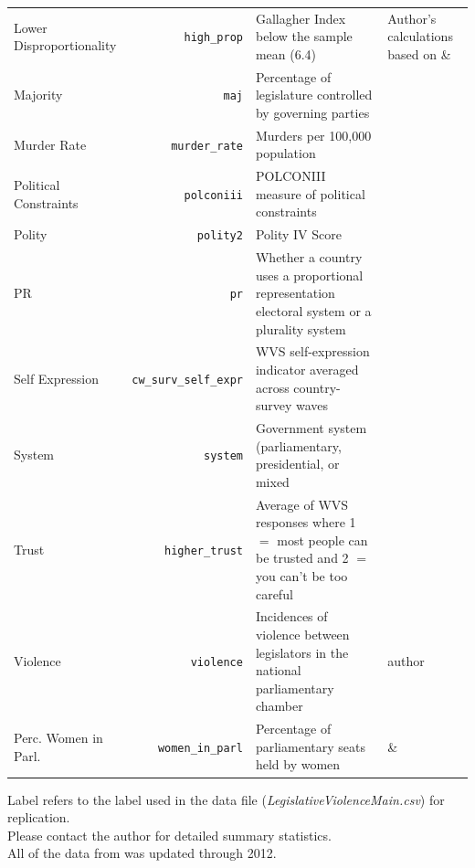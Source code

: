 \documentclass[a4paper]{article}\usepackage[]{graphicx}\usepackage[]{color}
\begin{document}
\begin{table}[!h]
\begin{center}
\begin{tabular}{m{2cm} r m{7cm} m{3.5cm}}
            Lower Disproportionality & \verb|high_prop| & Gallagher Index below the sample mean (6.4) & Author's calculations based on \cite{Gallagher2012} \& \cite{Carey2011}\\
            Majority & \texttt{maj} & Percentage of legislature controlled by governing parties & \cite{DPI2001} \\
            Murder Rate & \verb|murder_rate| & Murders per 100,000 population & \cite{UNMurder2013} \\
            Political Constraints & \texttt{polconiii} & POLCONIII measure of political constraints & \cite[][updated through 2011]{Henisz2004} \\
            Polity & \texttt{polity2} & Polity IV Score & \cite{Marshall2009} \\
            PR & \texttt{pr} & Whether a country uses a proportional representation electoral system or a plurality system & \cite{DPI2001} \\
            Self Expression & \verb|cw_surv_self_expr| & WVS self-expression indicator averaged across country-survey waves & \cite{WVS2009} \\
            System & \texttt{system} & Government system (parliamentary, presidential, or mixed & \cite{DPI2001} \\
            Trust & \verb|higher_trust| & Average of WVS responses where 1 $=$ most people can be trusted and 2 $=$ you can't be too careful & \cite{WVS2009} \\
            Violence & \texttt{violence} & Incidences of violence between legislators in the national parliamentary chamber & author \\
            Perc. Women in Parl. & \verb|women_in_parl| & Percentage of parliamentary seats held by women & \cite{WomParCrossNat} \& \cite{IPU2013} \\
            \hline

    \end{tabular}
    \end{center}
    \begin{singlespace}
        Label refers to the label used in the data file (\emph{LegislativeViolenceMain.csv}) for replication. \\
        Please contact the author for detailed summary statistics. \\
        All of the data from \cite{DPI2001} was updated through 2012.
    \end{singlespace}

\end{table}
\end{document}
